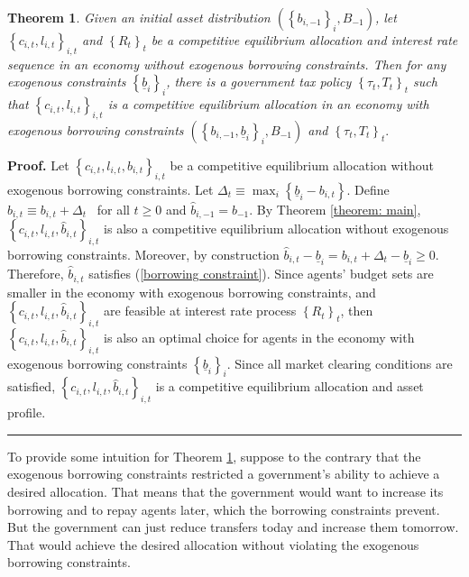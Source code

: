 \documentclass[thmsb,11pt]{article}
\newtheorem{theorem}{Theorem}
\newenvironment{proof}[1][Proof]{\noindent \textbf{#1.} }{\  \rule{0.5em}{0.5em}}
\begin{document}
\begin{theorem}
\label{thm:borrowing_constraint}  Given an initial asset distribution $\left(
\left\{ b_{i,-1}\right\} _{i},B_{-1}\right)$, let $\left\{ c_{i,t},l_{i,t}\right\} _{i,t}$ and $\left\{ R_{t}\right\}_t $ be a competitive
equilibrium allocation and interest rate sequence in an economy without
exogenous borrowing constraints. Then for any exogenous
constraints $\left\{ \underline{b}_{i}\right\} _{i}$, there is a government
tax policy $\left\{ \tau _{t},T_{t}\right\} _{t}$ such that $\left\{
c_{i,t},l_{i,t}\right\} _{i,t}$ is a competitive equilibrium
allocation in an economy with exogenous borrowing constraints $\left(
\left\{ b_{i,-1},\underline{b}_{i}\right\} _{i},B_{-1}\right) $ and $\left\{
\tau _{t},T_{t}\right\} _{t}.$
\end{theorem}

\begin{proof}
Let $\left\{ c_{i,t},l_{i,t},b_{i,t}\right\} _{i,t}$
be a competitive equilibrium allocation without exogenous borrowing
constraints. Let $\Delta _{t}\equiv \max_{i}\left\{ \underline{b}%
_{i}-b_{i,t}\right\} .$ Define $\hat{b}_{i,t}\equiv b_{i,t}+\Delta _{t}$ \ for all $t\geq 0$ and $\hat{b}_{i,-1}=b_{-1}.$ By Theorem %
\ref{theorem: main}, $\left\{ c_{i,t},l_{i,t},\hat{b}%
_{i,t}\right\} _{i,t}$ is also a competitive equilibrium allocation without
exogenous borrowing constraints. Moreover, by construction $\hat{b}_{i,t}-%
\underline{b}_{i}=b_{i,t}+\Delta _{t}-\underline{b}_{i}\geq 0$.
Therefore, $\hat{b}_{i,t}$ satisfies (\ref{borrowing constraint}). Since
agents' budget sets are smaller in the economy with exogenous borrowing
constraints, and $\left\{ c_{i,t},l_{i,t},\hat{b}%
_{i,t}\right\} _{i,t}$ are feasible at interest rate process $\left\{
R_{t}\right\} _{t}$, then $\left\{ c_{i,t},l_{i,t},%
\hat{b}_{i,t}\right\} _{i,t}$ is also an optimal choice for agents in the
economy with exogenous borrowing constraints $\left\{ \underline{b}%
_{i}\right\} _{i}.$ Since all market clearing conditions are satisfied, $%
\left\{ c_{i,t},l_{i,t},\hat{b}_{i,t}\right\} _{i,t}$ is a
competitive equilibrium allocation and asset profile.
\end{proof}

To provide some intuition for Theorem \ref{thm:borrowing_constraint}, suppose to the contrary that the exogenous borrowing constraints  restricted a  government's
 ability to achieve a desired allocation. That  means that
the government would want to increase  its borrowing
and to repay agents later, which the borrowing constraints prevent. But the government can just reduce
transfers today and increase them tomorrow. That would  achieve the  desired  allocation
without violating the exogenous borrowing constraints.
\end{document}
